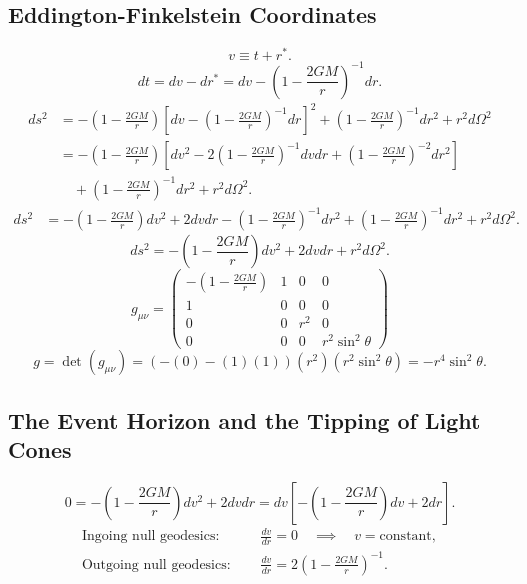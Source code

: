 \documentclass[11pt, a4paper]{report}
\begin{document}
\subsection{Eddington-Finkelstein Coordinates}
\begin{equation}
\label{eq:advanced_v}
v \equiv t + r^{*}.
\end{equation}
\begin{equation}
dt = dv - dr^{*} = dv - \left( 1 - \frac{2GM}{r} \right)^{-1} dr.
\end{equation}
\begin{align}
ds^{2} &= -\left( 1 - \frac{2GM}{r} \right) \left[ dv - \left( 1 - \frac{2GM}{r} \right)^{-1} dr \right]^{2} + \left( 1 - \frac{2GM}{r} \right)^{-1} dr^{2} + r^{2} d\Omega^{2} \nonumber \\
&= -\left( 1 - \frac{2GM}{r} \right) \left[ dv^{2} - 2\left( 1 - \frac{2GM}{r} \right)^{-1} dv dr + \left( 1 - \frac{2GM}{r} \right)^{-2} dr^{2} \right] \nonumber \\
&\quad + \left( 1 - \frac{2GM}{r} \right)^{-1} dr^{2} + r^{2} d\Omega^{2}.
\end{align}
\begin{align}
ds^{2} &= -\left( 1 - \frac{2GM}{r} \right)dv^{2} + 2 dv dr - \left( 1 - \frac{2GM}{r} \right)^{-1} dr^{2} + \left( 1 - \frac{2GM}{r} \right)^{-1} dr^{2} + r^{2} d\Omega^{2}.
\end{align}
\begin{equation}
\label{eq:eddington_metric}
ds^{2} = -\left( 1 - \frac{2GM}{r} \right)dv^{2} + 2 dv dr + r^{2} d\Omega^{2}.
\end{equation}
\begin{equation}
g_{\mu\nu} =
\begin{pmatrix}
-\left(1-\frac{2GM}{r}\right) & 1 & 0 & 0 \\
1 & 0 & 0 & 0 \\
0 & 0 & r^{2} & 0 \\
0 & 0 & 0 & r^{2}\sin^{2}\theta
\end{pmatrix}
\end{equation}
\begin{equation}
g = \det(g_{\mu\nu}) = (-(0) - (1)(1))(r^{2})(r^{2}\sin^{2}\theta) = -r^{4}\sin^{2}\theta.
\end{equation}

\subsection{The Event Horizon and the Tipping of Light Cones}
\begin{equation}
0 = -\left( 1 - \frac{2GM}{r} \right)dv^{2} + 2 dv dr = dv \left[ -\left( 1 - \frac{2GM}{r} \right)dv + 2dr \right].
\end{equation}
\begin{align}
\text{Ingoing null geodesics: } \quad &\frac{dv}{dr} = 0 \quad \implies \quad v = \text{constant}, \\
\text{Outgoing null geodesics: } \quad &\frac{dv}{dr} = 2 \left( 1 - \frac{2GM}{r} \right)^{-1}.
\end{align}
\end{document}
